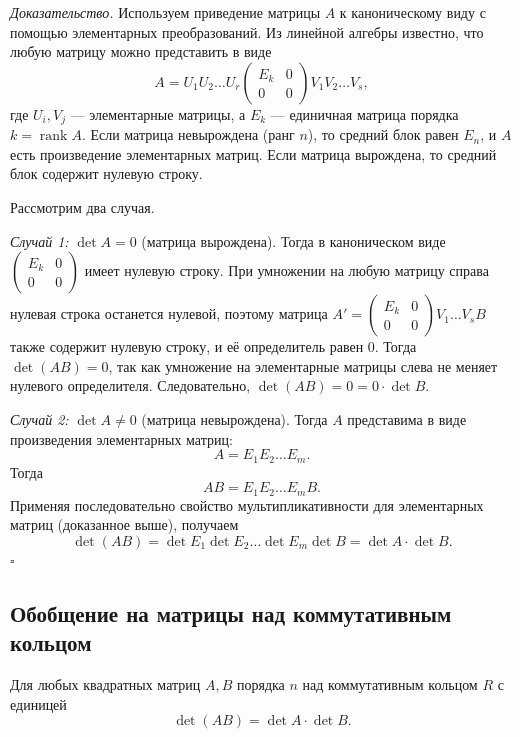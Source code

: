 \documentclass[a4paper,12pt]{article}
\theoremstyle{definition}
\theoremstyle{plain}
\theoremstyle{remark}
\begin{document}
	\medskip
	\textit{Доказательство.}
	Используем приведение матрицы \( A \) к каноническому виду с помощью элементарных преобразований. Из линейной алгебры известно, что любую матрицу можно представить в виде
	\[
	A = U_1 U_2 \dots U_r \begin{pmatrix} E_k & 0 \\ 0 & 0 \end{pmatrix} V_1 V_2 \dots V_s,
	\]
	где \( U_i, V_j \) — элементарные матрицы, а \( E_k \) — единичная матрица порядка \( k = \operatorname{rank} A \). Если матрица невырождена (ранг \( n \)), то средний блок равен \( E_n \), и \( A \) есть произведение элементарных матриц. Если матрица вырождена, то средний блок содержит нулевую строку.
	
	Рассмотрим два случая.
	
	\textit{Случай 1:} \( \det A = 0 \) (матрица вырождена). Тогда в каноническом виде \( \begin{pmatrix} E_k & 0 \\ 0 & 0 \end{pmatrix} \) имеет нулевую строку. При умножении на любую матрицу справа нулевая строка останется нулевой, поэтому матрица \( A' = \begin{pmatrix} E_k & 0 \\ 0 & 0 \end{pmatrix} V_1 \dots V_s B \) также содержит нулевую строку, и её определитель равен 0. Тогда \( \det(AB) = 0 \), так как умножение на элементарные матрицы слева не меняет нулевого определителя. Следовательно, \( \det(AB) = 0 = 0 \cdot \det B \).
	
	\textit{Случай 2:} \( \det A \neq 0 \) (матрица невырождена). Тогда \( A \) представима в виде произведения элементарных матриц:
	\[
	A = E_1 E_2 \dots E_m.
	\]
	Тогда
	\[
	AB = E_1 E_2 \dots E_m B.
	\]
	Применяя последовательно свойство мультипликативности для элементарных матриц (доказанное выше), получаем
	\[
	\det(AB) = \det E_1 \det E_2 \dots \det E_m \det B = \det A \cdot \det B.
	\]
	\hfill \(\square\)
	
	\subsection{Обобщение на матрицы над коммутативным кольцом}
	
	\begin{tcolorbox}[colback=yellow!5, colframe=orange!50!black, title=Теорема (Общий случай)]
		Для любых квадратных матриц \( A, B \) порядка \( n \) над коммутативным кольцом \( R \) с единицей
		\[
		\det(AB) = \det A \cdot \det B.
		\]
	\end{tcolorbox}
	
\end{document}
